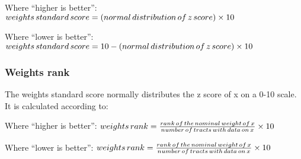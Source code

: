 \documentclass[
]{article}
\begin{document}
Where ``higher is better'':
\(weights \, standard\, score = (normal\, distribution\, of\, z\, score)\times 10\\\)

Where ``lower is better'':
\(weights \, standard\, score = 10 - (normal\, distribution\, of\, z\, score)\times 10\\\)

\hypertarget{weights-rank}{%
\subsubsection{Weights rank}\label{weights-rank}}

The weights standard score normally distributes the z score of x on a
0-10 scale. It is calculated according to:

Where ``higher is better'':
\(weights \, rank = \frac{rank\, of\, the\, nominal \,weight\,of\,x}{number \, of \,tracts\, with\,data \, on\,x}\times 10\\\)

Where ``lower is better'':
\(weights \, rank = \frac{rank\, of\, the\, nominal \,weight\,of\,x}{number \, of \,tracts\, with\,data \, on\,x}\times 10\\\)
\end{document}
